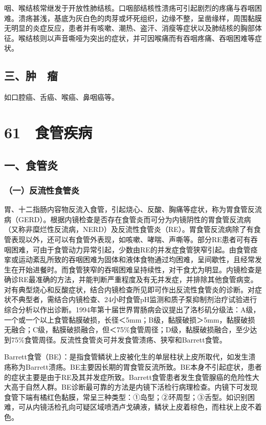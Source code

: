 咽、喉结核常继发于开放性肺结核。口咽部结核性溃疡可引起剧烈的疼痛与吞咽困难。溃疡甚浅，基底为灰白色的肉芽或坏死组织，边缘不整，呈凿缘样，周围黏膜无明显的炎症反应，患者并有咳嗽、潮热、盗汗、消瘦等症状以及肺结核的胸部体征。喉结核则以声音嘶哑为突出的症状，并可因喉痛而有吞咽疼痛、吞咽困难等症状。

\subsection{三、肿　瘤}

如口腔癌、舌癌、喉癌、鼻咽癌等。

\protect\hypertarget{text00156.html}{}{}

\section{61　食管疾病}

\subsection{一、食管炎}

\subsubsection{（一）反流性食管炎}

胃、十二指肠内容物反流入食管，引起烧心、反酸、胸痛等症状，称为胃食管反流病（GERD）。根据内镜检查是否存在食管炎而可分为内镜阴性的胃食管反流病（又称非糜烂性反流病，NERD）及反流性食管炎（RE）。胃食管反流病除了有食管表现以外，还可以有食管外表现，如咳嗽、哮喘、声嘶等。部分RE患者可有吞咽困难，可由于食管动力异常引起，少数由RE的并发症食管狭窄引起。由食管痉挛或运动紊乱所致的吞咽困难为固体和液体食物通过均困难，呈间歇性，且经常发生在开始进餐时。而食管狭窄的吞咽困难呈持续性，对干食尤为明显。内镜检查是确诊RE最准确的方法，并能判断严重程度及有无并发症，并排除其他食管病变。对有典型烧心和反酸症状，结合内镜检查所见即可作出反流性食管炎的诊断。对症状不典型者，需结合内镜检查、24小时食管pH监测和质子泵抑制剂治疗试验进行综合分析以作出诊断。1994年第十届世界胃肠病会议提出了洛杉矶分级法：A级，一个或一个以上食管黏膜破损，长径＜5mm；B级，黏膜破损＞5mm，黏膜破损无融合；C级，黏膜破损融合，但＜75\%食管周径；D级，黏膜破损融合，至少达到75\%食管周径。反流性食管炎可并发食管溃疡、狭窄和Barrett食管。

Barrett食管（BE）：是指食管鳞状上皮被化生的单层柱状上皮所取代，如发生溃疡称为Barrett溃疡。BE主要因长期的胃食管反流所致。BE本身不引起症状，患者的症状主要是由于RE及其并发症所致。Barrett食管患者发生食管腺癌的危险性大大高于自然人群。BE诊断最可靠的方法是内镜下活检行病理检查。内镜下可发现食管下端有橘红色黏膜，常呈三种类型：①岛型；②环周型；③舌型。如识别困难，可从内镜活检孔向可疑区域喷洒卢戈碘液，鳞状上皮着棕色，而柱状上皮不着色。

